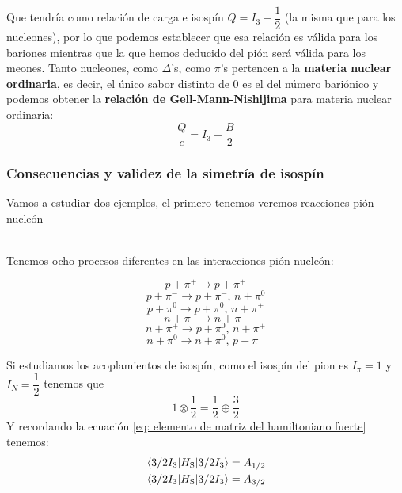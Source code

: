 Que tendría como relación de carga e isospín $Q=I_3+\dfrac{1}{2}$ (la misma que para los nucleones), por lo que podemos establecer que esa relación es válida para los bariones mientras que la que hemos deducido del pión será válida para los meones. Tanto nucleones, como $\Delta$'s, como $\pi$'s pertencen a la \textbf{materia nuclear ordinaria}, es decir, el único sabor distinto de 0 es el del número bariónico y podemos obtener la \textbf{relación de Gell-Mann-Nishijima} para materia nuclear ordinaria:
\begin{equation}
    \boxed{\frac{Q}{e}=I_3+\frac{B}{2}}
    \label{eq: Relacon de Gell-Mann Nishijima sin extrañeza}
\end{equation}
\newpage
\subsubsection{Consecuencias y validez de la simetría de isospín}
Vamos a estudiar dos ejemplos, el primero tenemos veremos reacciones pión nucleón\\\\
\noindent
\begin{minipage}{0.45\textwidth}
Tenemos ocho procesos diferentes en las interacciones pión nucleón:

    \begin{equation*}
    p + \pi^+ \longrightarrow p + \pi^+
\end{equation*}
\begin{equation*}
    p + \pi^- \longrightarrow p + \pi^-, \, n + \pi^0
\end{equation*}
\begin{equation*}
    p + \pi^0 \longrightarrow p + \pi^0, \, n + \pi^+
\end{equation*}
\begin{equation*}
    n + \pi^- \longrightarrow n + \pi^-
\end{equation*}
\begin{equation*}
    n + \pi^+ \longrightarrow p + \pi^0, \, n + \pi^+
\end{equation*}
\begin{equation*}
    n + \pi^0 \longrightarrow n + \pi^0, \, p + \pi^-
\end{equation*}

\end{minipage}
\hfill
\begin{minipage}{0.45\textwidth}
    Si estudiamos los acoplamientos de isospín, como el isospín del pion es $I_\pi=1$ y $I_N=\dfrac{1}{2}$ tenemos que 
    \begin{equation*}
        1\otimes \frac{1}{2}=\frac{1}{2}\oplus \frac{3}{2}
    \end{equation*}
    Y recordando la ecuación \ref{eq: elemento de matriz del hamiltoniano fuerte} tenemos:
    \begin{equation*}
        \begin{aligned}
            & \ev{H_\mathrm{S}}{3/2 I_3}=A_{1/2}\\
            & \ev{H_\mathrm{S}}{3/2 I_3}=A_{3/2}
        \end{aligned}
    \end{equation*}    
\end{minipage}\\\\
